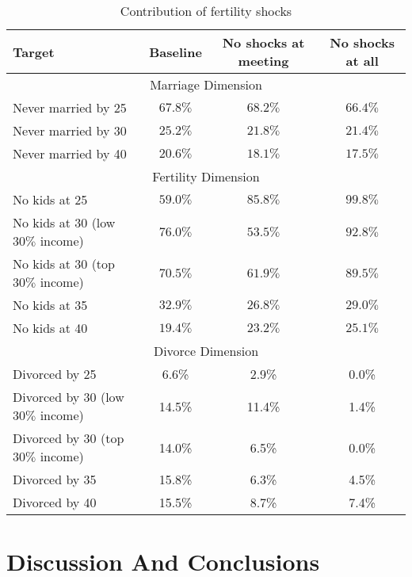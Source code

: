 \documentclass[12pt,letter]{article}
\begin{document}
\begin{table}
\begin{center}
\begin{tabular}{|l|c|c|c|}\hline
Target & Baseline & No shocks at meeting & No shocks at all \\\hline
\multicolumn{4}{|c|}{Marriage Dimension} \\\hline
Never married by 25  & $67.8\%$ & $68.2\%$ & $66.4\%$  \\
Never married by 30 & $25.2\%$ & $21.8\%$ & $21.4\%$  \\
Never married by 40 & $20.6\%$ & $18.1\%$ & $17.5\%$  \\\hline
\multicolumn{4}{|c|}{Fertility Dimension} \\\hline
No kids at 25 & $59.0\%$ & $85.8\%$ & $99.8\%$ \\
No kids at 30 (low $30\%$ income) & $76.0\%$  &   $53.5\%$ & $92.8\%$ \\
No kids at 30 (top $30\%$ income) & $70.5\%$  &   $61.9\%$ & $89.5\%$ \\
No kids at 35  & $32.9\%$  &   $26.8\%$ & $29.0\%$ \\
No kids at 40 & $19.4\%$   &  $23.2\%$  & $25.1\%$ \\\hline
\multicolumn{4}{|c|}{Divorce Dimension} \\\hline
Divorced by 25 & 6.6\%   &  2.9\% & 0.0\% \\
Divorced by 30 (low $30\%$ income)  & 14.5\% &     11.4\% & 1.4\% \\
Divorced by 30 (top $30\%$ income)  & 14.0\% &     6.5\%  & 0.0\% \\
Divorced by 35  & 15.8\% &    6.3\% & 4.5\% \\
Divorced by 40  & 15.5\% &    8.7\% & 7.4\% \\\hline
\end{tabular}
\caption{Contribution of fertility shocks \label{cf-shocks}}
\end{center}
\end{table}









\section{Discussion And Conclusions}
\end{document}
